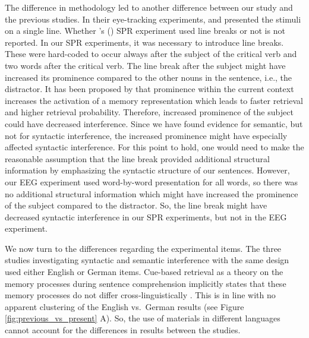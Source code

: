 \documentclass[review,preprint,12pt,authoryear,floatsintext]{elsarticle}
\begin{document}
{{The difference in methodology led to another difference between our study and the previous studies. In their eye-tracking experiments, \cite{vandyke07} and \cite{mertzen} presented the stimuli on a single line. Whether \citeauthor{vandyke07}'s (\citeyear{vandyke07}) SPR experiment used line breaks or not is not reported. In our SPR experiments, it was necessary to introduce line breaks. These were hard-coded to occur always after the subject of the critical verb and two words after the critical verb. The line break after the subject might have increased its prominence compared to the other nouns in the sentence, i.e., the distractor. It has been proposed by \cite{engelmann_etal_2019} that prominence within the current context increases the activation of a memory representation which leads to faster retrieval and higher retrieval probability. Therefore, increased prominence of the subject could have decreased interference. Since we have found evidence for semantic, but not for syntactic interference, the increased prominence might have especially affected syntactic interference. For this point to hold, one would need to make the reasonable assumption that the line break provided additional structural information by emphasizing the syntactic structure of our sentences. However, our EEG experiment used word-by-word presentation for all words, so there was no additional structural information which might have increased the prominence of the subject compared to the distractor. So, the line break might have decreased syntactic interference in our SPR experiments, but not in the EEG experiment. \label{thisdesign1} 

We now turn to the differences regarding the experimental items. The three studies investigating syntactic and semantic interference with the same design used either English or German items. Cue-based retrieval as a theory on the memory processes during sentence comprehension implicitly states that these memory processes do not differ cross-linguistically \citep{lewis06, Lewis2005}. This is in line with no apparent clustering of the English vs.\ German results (see Figure \ref{fig:previous_vs_present} A). So, the use of materials in different languages cannot account for the differences in results between the studies.

}}
\end{document}
